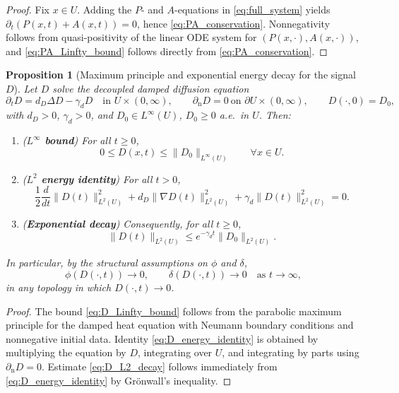 \documentclass[pdflatex,sn-mathphys-ay]{sn-jnl}
\theoremstyle{thmstyleone}
\newtheorem{proposition}[theorem]{Proposition}
\theoremstyle{definition}
\theoremstyle{remark}
\begin{document}
\begin{proof}
Fix $x\in U$. Adding the $P$- and $A$-equations in \eqref{eq:full_system} yields
$\partial_t(P(x,t)+A(x,t))=0$, hence \eqref{eq:PA_conservation}.
Nonnegativity follows from quasi-positivity of the linear ODE system for $(P(x,\cdot),A(x,\cdot))$, and
\eqref{eq:PA_Linfty_bound} follows directly from \eqref{eq:PA_conservation}.
\end{proof}

\begin{proposition}[Maximum principle and exponential energy decay for the signal $D$]
\label{prop:D_decay}
Let $D$ solve the decoupled damped diffusion equation
\[
\partial_t D = d_D\Delta D - \gamma_d D \quad \text{in }U\times(0,\infty),\qquad
\partial_{\mathrm n}D=0 \ \text{on }\partial U\times(0,\infty),\qquad
D(\cdot,0)=D_0,
\]
with $d_D>0$, $\gamma_d>0$, and $D_0\in L^\infty(U)$, $D_0\ge0$ a.e.\ in $U$.
Then:
\begin{enumerate}[label=(\roman*), leftmargin=*]
\item (\textbf{$L^\infty$ bound}) For all $t\ge 0$,
\begin{equation}
\label{eq:D_Linfty_bound}
0\le D(x,t)\le \|D_0\|_{L^\infty(U)} \qquad \forall x\in U.
\end{equation}
\item (\textbf{$L^2$ energy identity}) For all $t>0$,
\begin{equation}
\label{eq:D_energy_identity}
\frac{1}{2}\frac{d}{dt}\|D(t)\|_{L^2(U)}^2
+d_D\|\nabla D(t)\|_{L^2(U)}^2+\gamma_d\|D(t)\|_{L^2(U)}^2=0.
\end{equation}
\item (\textbf{Exponential decay}) Consequently, for all $t\ge0$,
\begin{equation}
\label{eq:D_L2_decay}
\|D(t)\|_{L^2(U)}\le e^{-\gamma_d t}\|D_0\|_{L^2(U)}.
\end{equation}
\end{enumerate}
In particular, by the structural assumptions on $\phi$ and $\delta$,
\begin{equation}
\label{eq:phi_delta_vanish}
\phi(D(\cdot,t))\to0,\qquad \delta(D(\cdot,t))\to0
\quad \text{as }t\to\infty,
\end{equation}
in any topology in which $D(\cdot,t)\to0$.
\end{proposition}

\begin{proof}
The bound \eqref{eq:D_Linfty_bound} follows from the parabolic maximum principle for the damped heat equation with Neumann boundary conditions and nonnegative initial data.
Identity \eqref{eq:D_energy_identity} is obtained by multiplying the equation by $D$, integrating over $U$, and integrating by parts using $\partial_{\mathrm n}D=0$.
Estimate \eqref{eq:D_L2_decay} follows immediately from \eqref{eq:D_energy_identity} by Gr\"onwall's inequality.
\end{proof}
\end{document}
